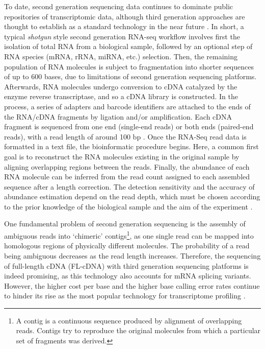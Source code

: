 \documentclass[
  openany]{book}
\begin{document}
To date, second generation sequencing data continues to dominate public repositories of transcriptomic data, although third generation approaches are thought to establish as a standard technology in the near future \autocite{Athanasopoulou2021}. In short, a typical \emph{shotgun} style second generation RNA-seq workflow involves first the isolation of total RNA from a biological sample, followed by an optional step of RNA species (mRNA, rRNA, miRNA, etc.) selection. Then, the remaining population of RNA molecules is subject to fragmentation into shorter sequences of up to 600 bases, due to limitations of second generation sequencing platforms. Afterwards, RNA molecules undergo conversion to cDNA catalyzed by the enzyme reverse transcriptase, and so a cDNA library is constructed. In the process, a series of adapters and barcode identifiers are attached to the ends of the RNA/cDNA fragments by ligation and/or amplification. Each cDNA fragment is sequenced from one end (single-end reads) or both ends (paired-end reads), with a read length of around 100 bp \autocite{Hrdlickova2017}. Once the RNA-Seq read data is formatted in a text file, the bioinformatic procedure begins. Here, a common first goal is to reconstruct the RNA molecules existing in the original sample by aligning overlapping regions between the reads. Finally, the abundance of each RNA molecule can be inferred from the read count assigned to each assembled sequence after a length correction. The detection sensitivity and the accuracy of abundance estimation depend on the read depth, which must be chosen according to the prior knowledge of the biological sample and the aim of the experiment \autocite{Kukurba2015}.

One fundamental problem of second generation sequencing is the assembly of ambiguous reads into `chimeric' contigs\footnote{A contig is a continuous sequence produced by alignment of overlapping reads. Contigs try to reproduce the original molecules from which a particular set of fragments was derived.}, as one single read can be mapped into homologous regions of physically different molecules. The probability of a read being ambiguous decreases as the read length increases. Therefore, the sequencing of full-length cDNA (FL-cDNA) with third generation sequencing platforms is indeed promising, as this technology also accounts for mRNA splicing variants. However, the higher cost per base and the higher base calling error rates continue to hinder its rise as the most popular technology for transcriptome profiling \autocite{Krizanovic2018}.
\end{document}
